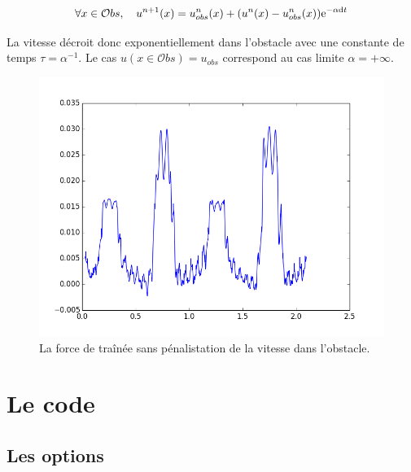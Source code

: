 		\begin{equation}
			\forall x \in \mathcal{O}bs, \ \ \
			u^{n+1}(x)= u^n_{obs}(x) + (u^n(x)-u^n_{obs}(x))\mathrm{e}^{-\alpha\mathrm{d}t}
			\label{penalisation}
		\end{equation}
		
		La vitesse décroit donc exponentiellement dans l'obstacle avec une constante de temps $\tau= \alpha^{-1}$. Le cas $u(x\in \mathcal{O}bs)=u_{obs}$ correspond au cas limite $\alpha = +\infty$.
		
		\begin{figure}[htbp]
		\begin{center}
			\includegraphics[width=0.7 \textwidth]{drag_degueu.png}
			\caption{La force de traînée sans pénalistation de la vitesse dans l'obstacle.}
		\end{center}
		\end{figure}


\section{Le code}

	\subsection{Les options}
		
